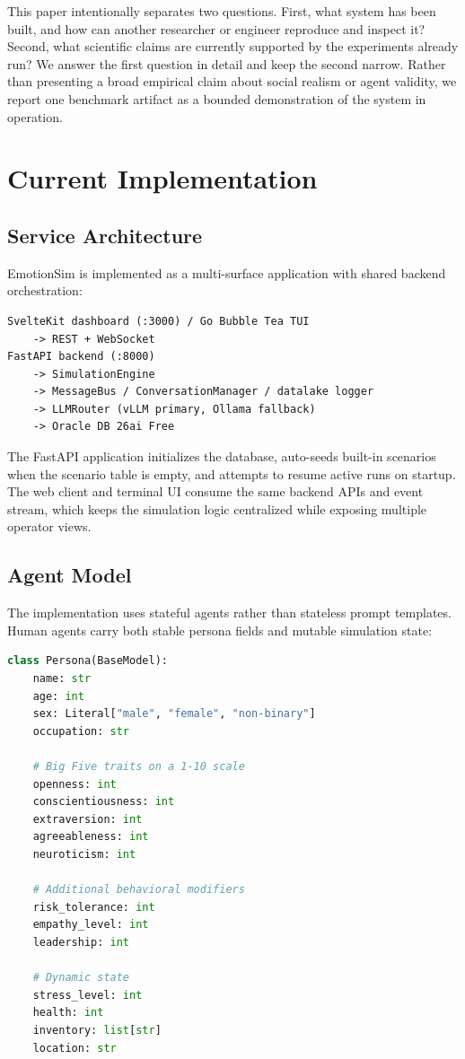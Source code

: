 \documentclass{article}
\begin{document}
This paper intentionally separates two questions. First, what system has been built, and how can another researcher or engineer reproduce and inspect it? Second, what scientific claims are currently supported by the experiments already run? We answer the first question in detail and keep the second narrow. Rather than presenting a broad empirical claim about social realism or agent validity, we report one benchmark artifact as a bounded demonstration of the system in operation.

\section{Current Implementation}
\subsection{Service Architecture}
EmotionSim is implemented as a multi-surface application with shared backend orchestration:

\begin{verbatim}
SvelteKit dashboard (:3000) / Go Bubble Tea TUI
    -> REST + WebSocket
FastAPI backend (:8000)
    -> SimulationEngine
    -> MessageBus / ConversationManager / datalake logger
    -> LLMRouter (vLLM primary, Ollama fallback)
    -> Oracle DB 26ai Free
\end{verbatim}

The FastAPI application initializes the database, auto-seeds built-in scenarios when the scenario table is empty, and attempts to resume active runs on startup. The web client and terminal UI consume the same backend APIs and event stream, which keeps the simulation logic centralized while exposing multiple operator views.

\subsection{Agent Model}
The implementation uses stateful agents rather than stateless prompt templates. Human agents carry both stable persona fields and mutable simulation state:

\begin{lstlisting}[language=Python, caption=Simplified Persona Schema]
class Persona(BaseModel):
    name: str
    age: int
    sex: Literal["male", "female", "non-binary"]
    occupation: str

    # Big Five traits on a 1-10 scale
    openness: int
    conscientiousness: int
    extraversion: int
    agreeableness: int
    neuroticism: int

    # Additional behavioral modifiers
    risk_tolerance: int
    empathy_level: int
    leadership: int

    # Dynamic state
    stress_level: int
    health: int
    inventory: list[str]
    location: str
\end{lstlisting}
\end{document}
